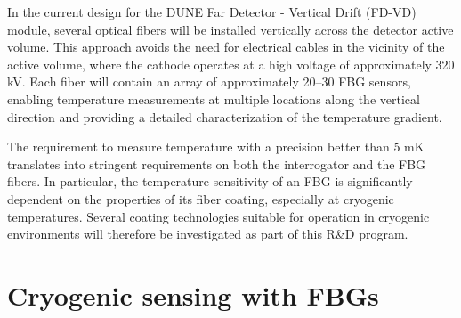\documentclass[12pt]{article}
\begin{document}
In the current design for the DUNE Far Detector - Vertical Drift (FD-VD) module, several optical fibers will be installed vertically across the detector active volume. This approach avoids the need for electrical cables in the vicinity of the active volume, where the cathode operates at a high voltage of approximately 320 kV. Each fiber will contain an array of approximately 20–30 FBG sensors, enabling temperature measurements at multiple locations along the vertical direction and providing a detailed characterization of the temperature gradient.

The requirement to measure temperature with a precision better than 5 mK translates into stringent requirements on both the interrogator and the FBG fibers. In particular, the temperature sensitivity of an FBG is significantly dependent on the properties of its fiber coating, especially at cryogenic temperatures. Several coating technologies suitable for operation in cryogenic environments will therefore be investigated as part of this R\&D program.



\section{Cryogenic sensing with FBGs}
\label{sec:fbgs}

\end{document}
